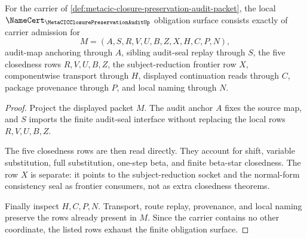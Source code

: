 \begin{theorem}
\label{thm:metacic-closure-preservation-audit-finite-obligation-surface}
For the carrier of \autoref{def:metacic-closure-preservation-audit-packet}, the local $\NameCert_{\MetaCICClosurePreservationAuditUp}$ obligation surface consists exactly of carrier admission for
$$
M=(A,S,R,V,U,B,Z,X,H,C,P,N),
$$
audit-map anchoring through $A$, sibling audit-seal replay through $S$, the five closedness rows $R,V,U,B,Z$, the subject-reduction frontier row $X$, componentwise transport through $H$, displayed continuation reads through $C$, package provenance through $P$, and local naming through $N$.
\end{theorem}
\begin{proof}
Project the displayed packet $M$. The audit anchor $A$ fixes the source map, and $S$ imports the finite audit-seal interface without replacing the local rows $R,V,U,B,Z$.

The five closedness rows are then read directly. They account for shift, variable substitution, full substitution, one-step beta, and finite beta-star closedness. The row $X$ is separate: it points to the subject-reduction socket and the normal-form consistency seal as frontier consumers, not as extra closedness theorems.

Finally inspect $H,C,P,N$. Transport, route replay, provenance, and local naming preserve the rows already present in $M$. Since the carrier contains no other coordinate, the listed rows exhaust the finite obligation surface.
\end{proof}

